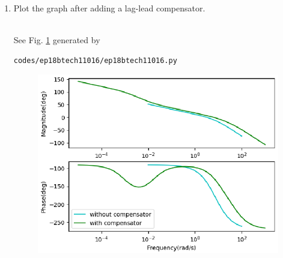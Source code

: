 \begin{enumerate}[label=\thesection.\arabic*.,ref=\thesection.\theenumi]

\item Plot the graph after adding a lag-lead compensator.

\solution\\
See Fig. \ref{fig:ep18btech11016_bode} generated by 
\begin{lstlisting}
codes/ep18btech11016/ep18btech11016.py
\end{lstlisting}

\begin{figure}[ht!]
    \centering
    \includegraphics[width=\columnwidth]{./figs/ep18btech11016/ep18btech11016_fig3.eps}
    \caption{}
    \label{fig:ep18btech11016_bode}
\end{figure}

\end{enumerate}
